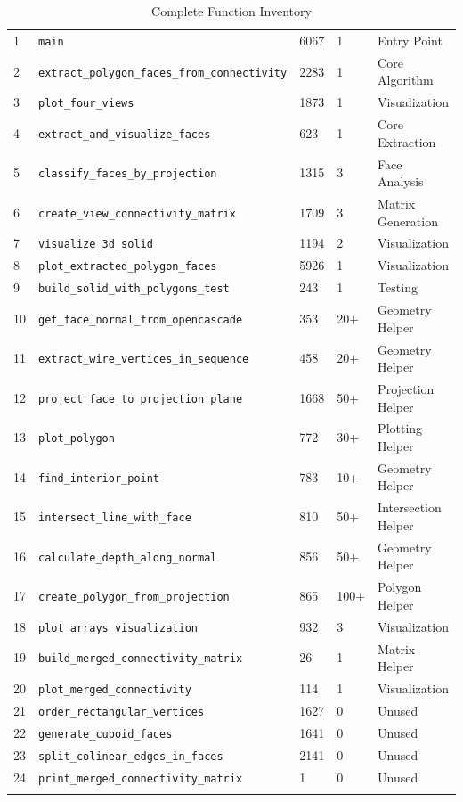 \documentclass[11pt,a4paper]{article}
\begin{document}
\begin{longtable}{p{} p{} p{} p{} p{}}
1 & \texttt{main} & 6067 & 1 & Entry Point \\
2 & \texttt{extract\_polygon\_faces\_from\_connectivity} & 2283 & 1 & Core Algorithm \\
3 & \texttt{plot\_four\_views} & 1873 & 1 & Visualization \\
4 & \texttt{extract\_and\_visualize\_faces} & 623 & 1 & Core Extraction \\
5 & \texttt{classify\_faces\_by\_projection} & 1315 & 3 & Face Analysis \\
6 & \texttt{create\_view\_connectivity\_matrix} & 1709 & 3 & Matrix Generation \\
7 & \texttt{visualize\_3d\_solid} & 1194 & 2 & Visualization \\
8 & \texttt{plot\_extracted\_polygon\_faces} & 5926 & 1 & Visualization \\
9 & \texttt{build\_solid\_with\_polygons\_test} & 243 & 1 & Testing \\
10 & \texttt{get\_face\_normal\_from\_opencascade} & 353 & 20+ & Geometry Helper \\
11 & \texttt{extract\_wire\_vertices\_in\_sequence} & 458 & 20+ & Geometry Helper \\
12 & \texttt{project\_face\_to\_projection\_plane} & 1668 & 50+ & Projection Helper \\
13 & \texttt{plot\_polygon} & 772 & 30+ & Plotting Helper \\
14 & \texttt{find\_interior\_point} & 783 & 10+ & Geometry Helper \\
15 & \texttt{intersect\_line\_with\_face} & 810 & 50+ & Intersection Helper \\
16 & \texttt{calculate\_depth\_along\_normal} & 856 & 50+ & Geometry Helper \\
17 & \texttt{create\_polygon\_from\_projection} & 865 & 100+ & Polygon Helper \\
18 & \texttt{plot\_arrays\_visualization} & 932 & 3 & Visualization \\
19 & \texttt{build\_merged\_connectivity\_matrix} & 26 & 1 & Matrix Helper \\
20 & \texttt{plot\_merged\_connectivity} & 114 & 1 & Visualization \\
21 & \texttt{order\_rectangular\_vertices} & 1627 & 0 & Unused \\
22 & \texttt{generate\_cuboid\_faces} & 1641 & 0 & Unused \\
23 & \texttt{split\_colinear\_edges\_in\_faces} & 2141 & 0 & Unused \\
24 & \texttt{print\_merged\_connectivity\_matrix} & 1 & 0 & Unused \\

\caption{Complete Function Inventory}
\label{tab:function_inventory}
\end{longtable}
\end{document}

